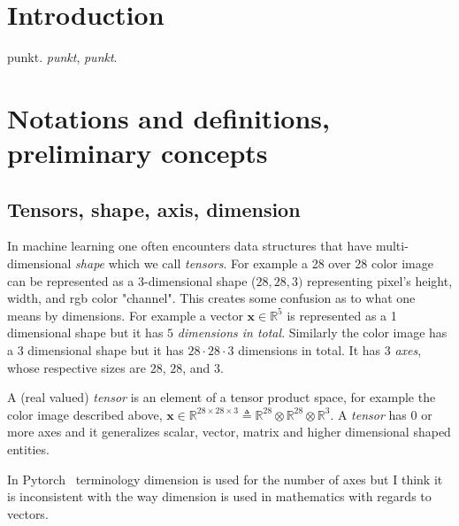 \documentclass[11pt, a4paper]{report}
\theoremstyle{plain}
\theoremstyle{definition}
\theoremstyle{remark}
\newcommand{\R}{\mathbb{R}}
\newcommand{\x}{\mathbf{x}}
\begin{document}
\listoftables

\listoffigures

\tableofcontents

\chapter{Introduction} punkt. \emph{punkt}, \textit{punkt}.

\chapter{Notations and definitions, preliminary concepts}


\section{Tensors, shape, axis, dimension}
In machine learning one often encounters data structures that have
multi-dimensional \emph{shape} which we call \emph{tensors}.
For example a 28 over 28 color image can be represented as
a 3-dimensional shape ($28, 28, 3)$ representing pixel's height, width, and rgb
color "channel". This creates some confusion as to what one means by dimensions.
For example a vector $\x \in \R^5$ is represented as a 1 dimensional shape
but it has $5$ \emph{dimensions in total}. Similarly the color image has a $3$ dimensional shape
but it has $28 \cdot 28 \cdot 3$ dimensions in total. It has 3 \emph{axes},
whose respective sizes are
$28$, $28$, and $3$. 

A (real valued) \emph{tensor} is an element of a tensor product space, for example
the color image described above,
$\x \in  \R^{28 \times 28 \times 3} 
\triangleq \R^{28} \otimes \R^{28} \otimes \R^3$. 
A \emph{tensor} has $0$ or more axes and it generalizes 
scalar, vector, matrix and higher dimensional shaped entities.

In Pytorch~\cite{pytorch2018pytorch} terminology dimension
is used for the number of axes but I think it is
inconsistent with the way dimension is used in mathematics with regards to vectors.
\end{document}
